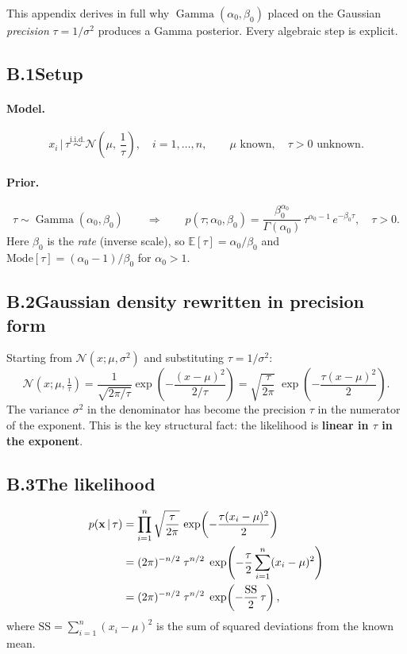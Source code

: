 \documentclass[11pt, a4paper]{article}
\newcommand{\N}{\mathcal{N}}
\newcommand{\E}{\mathbb{E}}
\newcommand{\Ga}{\operatorname{Gamma}}
\theoremstyle{definition}
\begin{document}
This appendix derives in full why $\Ga(\alpha_0,\beta_0)$ placed on the
Gaussian \emph{precision} $\tau=1/\sigma^2$ produces a Gamma posterior.
Every algebraic step is explicit.

\subsection*{B.1\quad Setup}

\paragraph{Model.}
\[
  x_i\,|\,\tau
    \overset{\mathrm{i.i.d.}}{\sim}
    \N\!\left(\mu,\,\frac{1}{\tau}\right),
  \quad i=1,\ldots,n,
  \qquad
  \mu \text{ known}, \quad \tau>0 \text{ unknown}.
\]
\paragraph{Prior.}
\[
  \tau \sim \Ga(\alpha_0,\beta_0)
  \qquad\Longrightarrow\qquad
  p(\tau;\alpha_0,\beta_0)
    = \frac{\beta_0^{\alpha_0}}{\Gamma(\alpha_0)}\,
      \tau^{\alpha_0-1}\,e^{-\beta_0\tau},
  \quad \tau>0.
\]
Here $\beta_0$ is the \emph{rate} (inverse scale), so
$\E[\tau]=\alpha_0/\beta_0$ and $\mathrm{Mode}[\tau]=(\alpha_0-1)/\beta_0$
for $\alpha_0>1$.

\subsection*{B.2\quad Gaussian density rewritten in precision form}

Starting from $\N(x;\mu,\sigma^2)$ and substituting $\tau=1/\sigma^2$:
\begin{equation}
  \N\!\left(x;\mu,\tfrac{1}{\tau}\right)
  = \frac{1}{\sqrt{2\pi/\tau}}\exp\!\left(-\frac{(x-\mu)^2}{2/\tau}\right)
  = \sqrt{\frac{\tau}{2\pi}}\;\exp\!\left(-\frac{\tau(x-\mu)^2}{2}\right).
  \label{eq:gauss_prec}
\end{equation}
The variance $\sigma^2$ in the denominator has become the precision $\tau$
in the numerator of the exponent.  This is the key structural fact: the
likelihood is \textbf{linear in $\tau$ in the exponent}.

\subsection*{B.3\quad The likelihood}

\begin{align}
  p(\mathbf{x}\,|\,\tau)
  &= \prod_{i=1}^n \sqrt{\frac{\tau}{2\pi}}\,
     \exp\!\left(-\frac{\tau(x_i-\mu)^2}{2}\right) \notag\\
  &= (2\pi)^{-n/2}\;\tau^{n/2}\;
     \exp\!\left(-\frac{\tau}{2}\sum_{i=1}^n(x_i-\mu)^2\right) \notag\\
  &= (2\pi)^{-n/2}\;\tau^{n/2}\;\exp\!\left(-\frac{\mathrm{SS}}{2}\,\tau\right),
  \label{eq:lik_prec}
\end{align}
where $\mathrm{SS}=\sum_{i=1}^n(x_i-\mu)^2$ is the sum of squared
deviations from the known mean.
\end{document}
